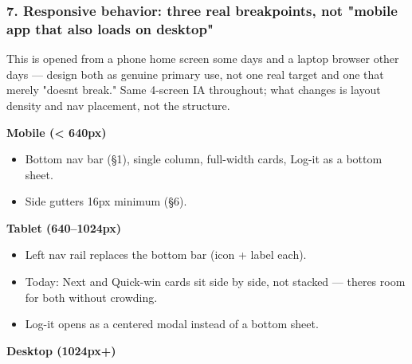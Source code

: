 \hypertarget{ui-ux-spec-7-responsive-behavior-three-real-breakpoints-not-mobile-app-that-also-loads-on-desktop}{%
\subsubsection{7. Responsive behavior: three real breakpoints, not
"mobile app that also loads on
desktop"}\label{ui-ux-spec-7-responsive-behavior-three-real-breakpoints-not-mobile-app-that-also-loads-on-desktop}}

This is opened from a phone home screen some days and a laptop browser
other days --- design both as genuine primary use, not one real target
and one that merely "doesn\textquotesingle t break." Same 4-screen IA
throughout; what changes is layout density and nav placement, not the
structure.

\textbf{Mobile (\textless{} 640px)}

\begin{itemize}
\tightlist
\item
  Bottom nav bar (§1), single column, full-width cards, Log-it as a
  bottom sheet.
\item
  Side gutters 16px minimum (§6).
\end{itemize}

\textbf{Tablet (640--1024px)}

\begin{itemize}
\tightlist
\item
  Left nav rail replaces the bottom bar (icon + label each).
\item
  Today: Next and Quick-win cards sit side by side, not stacked ---
  there\textquotesingle s room for both without crowding.
\item
  Log-it opens as a centered modal instead of a bottom sheet.
\end{itemize}

\textbf{Desktop (1024px+)}


